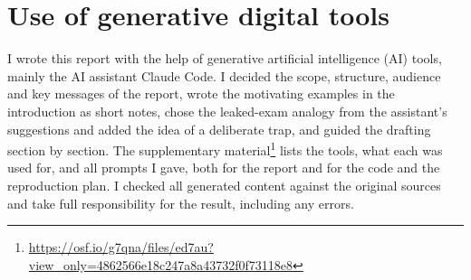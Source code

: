 \documentclass[a4paper]{article}
\newcommand{\supplurl}{\url{https://osf.io/g7qna/files/ed7au?view_only=4862566e18c247a8a43732f0f73118e8}}
\begin{document}
\section*{Use of generative digital tools}
\label{sec:ai-use}

I wrote this report with the help of generative artificial intelligence (AI) tools, mainly the AI assistant Claude Code.
I decided the scope, structure, audience and key messages of the report, wrote the motivating examples in the introduction as short notes, chose the leaked-exam analogy from the assistant's suggestions and added the idea of a deliberate trap, and guided the drafting section by section.
The supplementary material\footnote{\supplurl} lists the tools, what each was used for, and all prompts I gave, both for the report and for the code and the reproduction plan.
I checked all generated content against the original sources and take full responsibility for the result, including any errors.





\end{document}
